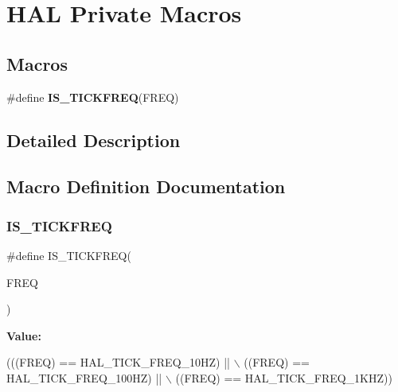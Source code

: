 \hypertarget{group___h_a_l___private___macros}{}\section{H\+AL Private Macros}
\label{group___h_a_l___private___macros}
\subsection*{Macros}
\begin{DoxyCompactItemize}
\item 
\#define {\bfseries I\+S\+\_\+\+T\+I\+C\+K\+F\+R\+EQ}(F\+R\+EQ)
\end{DoxyCompactItemize}


\subsection{Detailed Description}


\subsection{Macro Definition Documentation}
\mbox{\label{group___h_a_l___private___macros_ga2a86bf8a89ad75716cd92e932a8ae71e}} 
\subsubsection{\texorpdfstring{I\+S\+\_\+\+T\+I\+C\+K\+F\+R\+EQ}{IS\_TICKFREQ}}
{\footnotesize\ttfamily \#define I\+S\+\_\+\+T\+I\+C\+K\+F\+R\+EQ(\begin{DoxyParamCaption}\item[{}]{F\+R\+EQ }\end{DoxyParamCaption})}

{\bfseries Value\+:}
\begin{DoxyCode}
(((FREQ) == HAL\_TICK\_FREQ\_10HZ)  || \(\backslash\)
                           ((FREQ) == HAL\_TICK\_FREQ\_100HZ) || \(\backslash\)
                           ((FREQ) == HAL\_TICK\_FREQ\_1KHZ))
\end{DoxyCode}
